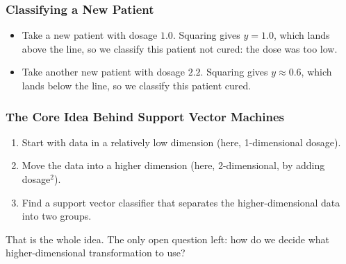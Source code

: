 \begin{frame}[fragile] \frametitle{Classifying a New Patient}
\begin{itemize}
\item Take a new patient with dosage $1.0$. Squaring gives $y=1.0$, which lands above the line, so we classify this patient not cured: the dose was too low.
\item Take another new patient with dosage $2.2$. Squaring gives $y \approx 0.6$, which lands below the line, so we classify this patient cured.
\end{itemize}
\begin{center}
\end{center}
\end{frame}

\begin{frame}[fragile] \frametitle{The Core Idea Behind Support Vector Machines}
\begin{enumerate}
\item Start with data in a relatively low dimension (here, 1-dimensional dosage).
\item Move the data into a higher dimension (here, 2-dimensional, by adding dosage$^2$).
\item Find a support vector classifier that separates the higher-dimensional data into two groups.
\end{enumerate}
That is the whole idea. The only open question left: how do we decide what higher-dimensional transformation to use?
\end{frame}

